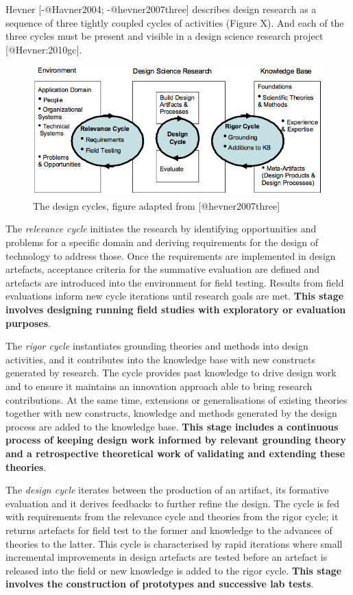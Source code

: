 Hevner {[}-@Havner2004; -@hevner2007three{]} describes design research
as a sequence of three tightly coupled cycles of activities (Figure X).
And each of the three cycles must be present and visible in a design
science research project {[}@Hevner:2010gc{]}.

\begin{figure}[htbp]
\centering
\includegraphics{imgs/design_cycles.png}
\caption{The design cycles, figure adapted from {[}@hevner2007three{]}}
\end{figure}

The \emph{relevance cycle} initiates the research by identifying
opportunities and problems for a specific domain and deriving
requirements for the design of technology to address those. Once the
requirements are implemented in design artefacts, acceptance criteria
for the summative evaluation are defined and artefacts are introduced
into the environment for field testing. Results from field evaluations
inform new cycle iterations until research goals are met. \textbf{This
stage involves designing running field studies with exploratory or
evaluation purposes}.

The \emph{rigor cycle} instantiates grounding theories and methods into
design activities, and it contributes into the knowledge base with new
constructs generated by research. The cycle provides past knowledge to
drive design work and to ensure it maintains an innovation approach able
to bring research contributions. At the same time, extensions or
generalisations of existing theories together with new constructs,
knowledge and methods generated by the design process are added to the
knowledge base. \textbf{This stage includes a continuous process of
keeping design work informed by relevant grounding theory and a
retrospective theoretical work of validating and extending these
theories}.

The \emph{design cycle} iterates between the production of an artifact,
its formative evaluation and it derives feedbacks to further refine the
design. The cycle is fed with requirements from the relevance cycle and
theories from the rigor cycle; it returns artefacts for field test to
the former and knowledge to the advances of theories to the latter. This
cycle is characterised by rapid iterations where small incremental
improvements in design artefacts are tested before an artefact is
released into the field or new knowledge is added to the rigor cycle.
\textbf{This stage involves the construction of prototypes and
successive lab tests}.

